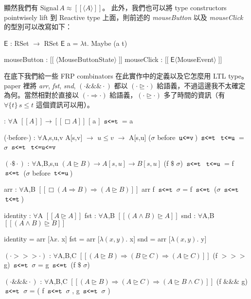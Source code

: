 \documentclass{article}
\newcommand{\llens}{[\![}
\newcommand{\rlens}{]\!]}
\newcommand{\TE}{\mathsf{E}}
\newcommand{\Wit}[1]{\,\text{\texttt{#1}}\,}
\newcommand{\Gs}{\sigma}
\newcommand{\Gl}{\lambda}
\begin{document}
  顯然我們有 $\text{Signal}\,A\approx \llens\langle A\rangle\rlens$。
  此外，我們也可以將 type constructors pointwisely lift 到 Reactive type
  上面，則前述的 \textit{mouseButton} 以及 \textit{mouseClick} 的型別可以改寫如下：

  \begin{code}
  $\TE$ : RSet $\to$ RSet
  $\TE$ a = $\Gl$t. Maybe (a t)

  mouseButton : $\llens\;\langle$MouseButtonState$\rangle\;\rlens$
  mouseClick   : $\llens\;\TE\langle$MouseEvent$\rangle\;\rlens$
  \end{code}

  在底下我們給一些 FRP combinators 在此實作中的定義以及它怎麼用 LTL type。
  paper 裡將 \textit{arr}, \textit{fst}, \textit{snd}, $(\cdot\&\!\&\!\&\cdot)$
  都以 $(\cdot\unrhd\cdot)$ 給語義，不過這邊我不太確定為何。當然相對於直接以
  $(\cdot\Rightarrow\cdot)$ 給語義，$(\cdot\unrhd\cdot)$ 多了時間的資訊（有
  $\forall\{t\}\,s\le t$ 這個資訊可以用）。

  \begin{minipage}[t]{\textwidth}
    \begin{minipage}[t]{0.46\textwidth}
      \begin{code}
[$\cdot$] : $\forall${A} $\llens A\rlens \to \llens\Box A\rlens$
[ a ] $\Wit{s<=t}$ = a

($\cdot$before$\cdot$) : $\forall${A,s,u,v} A[s,v] $\to$ $u\le v$ $\to$ A[s,u]
($\Gs$ before $\Wit{u<=v}$) $\Wit{s<=t}$ $\Wit{t<=u}$ = $\Gs$ $\Wit{s<=t}$ $\Wit{t<=u<=v}$

$(\cdot\$\cdot)$ : $\forall${A,B,s,u} $(A\unrhd B)\to A[s,u] \to B[s,u]$
(f $\$$ $\Gs$) $\Wit{s<=t}$ $\Wit{t<=u}$ = f $\Wit{s<=t}$ ($\Gs$ before $\Wit{t<=u}$)

arr : $\forall${A,B} $\llens\Box(A\Rightarrow B)\Rightarrow (A\unrhd B)\rlens$
arr f $\Wit{s<=t}$ $\Gs$ = f $\Wit{s<=t}$ ($\Gs$ $\Wit{s<=t}$ $\Wit{t<=t}$)
      \end{code}
    \end{minipage}
    \begin{minipage}[t]{0.54\textwidth}
      \begin{code}
identity : $\forall${A} $\llens A\unrhd A\rlens$
fst : $\forall${A,B} $\llens (A\land B) \unrhd A\rlens$
snd : $\forall${A,B} $\llens (A\land B) \unrhd B\rlens$

identity = arr [$\Gl x.$ x]
fst = arr [$\Gl(x,y).$ x]
snd = arr [$\Gl(x,y).$ y]

$(\cdot>\!\!>\!\!>\cdot)$ : $\forall${A,B,C} $\llens(A\unrhd B) \Rightarrow  (B\unrhd C)\Rightarrow (A \unrhd C)\rlens$
(f $>\!\!>\!\!>$ g) $\Wit{s<=t}$ $\Gs$ = g $\Wit{s<=t}$ (f $\$$ $\Gs$)

$(\cdot\&\!\&\!\&\cdot)$ : $\forall${A,B,C} $\llens(A\unrhd B)\Rightarrow (A\unrhd C) \Rightarrow (A \unrhd B\land C) \rlens$
(f $\&\!\&\!\&$ g) $\Wit{s<=t}$ $\Gs$ = ( f $\Wit{s<=t}$ $\Gs$ , g $\Wit{s<=t}$ $\Gs$ )
      \end{code}
    \end{minipage}
  \end{minipage}
\end{document}
